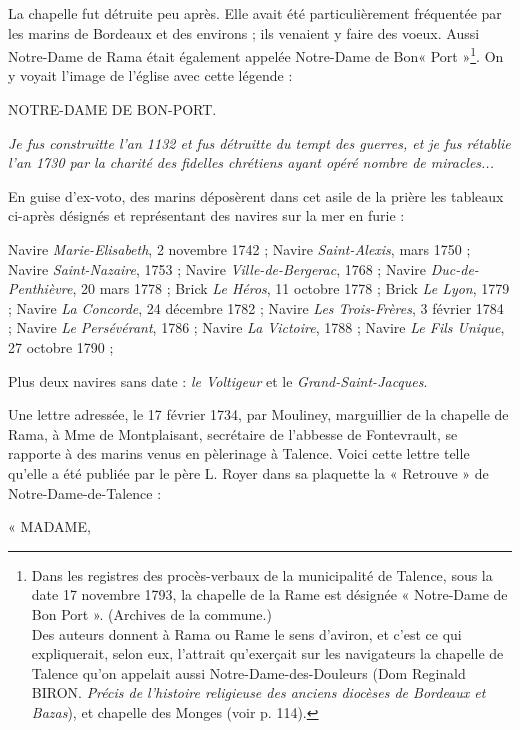 La chapelle fut détruite peu après. Elle avait été particulièrement fréquentée par les marins de Bordeaux et des environs ; ils venaient y faire des voeux. Aussi Notre-Dame de Rama était également appelée Notre-Dame de Bon« Port »\footnote{Dans les registres des procès-verbaux de la municipalité de Talence, sous la date 17 novembre 1793, la chapelle de la Rame est désignée « Notre-Dame de Bon Port ». (Archives de la commune.)\\Des auteurs donnent à Rama ou Rame le sens d'aviron, et c'est ce qui expliquerait, selon eux, l'attrait qu'exerçait sur les navigateurs la chapelle de Talence qu'on appelait aussi Notre-Dame-des-Douleurs (Dom Reginald BIRON. \textit{Précis de l'histoire religieuse des anciens diocèses de Bordeaux et Bazas}), et chapelle des Monges (voir p. 114).}. On y voyait l'image de l'église avec cette légende :

\begin{center}
NOTRE-DAME DE BON-PORT.
\end{center}

\textit{Je fus construitte l'an 1132 et fus détruitte du tempt des guerres, et je fus rétablie l'an 1730 par la charité des fidelles chrétiens ayant opéré nombre de miracles...}

En guise d'ex-voto, des marins déposèrent dans cet asile de la prière les tableaux ci-après désignés et représentant des navires sur la mer en furie : 

Navire \textit{Marie-Elisabeth}, 2 novembre 1742 ;
Navire \textit{Saint-Alexis}, mars 1750 ; 
Navire \textit{Saint-Nazaire}, 1753 ;
Navire \textit{Ville-de-Bergerac}, 1768 ;
Navire \textit{Duc-de-Penthièvre}, 20 mars 1778 ;
Brick \textit{Le Héros}, 11 octobre 1778 ;
Brick \textit{Le Lyon}, 1779 ;
Navire \textit{La Concorde}, 24 décembre 1782 ;
Navire \textit{Les Trois-Frères}, 3 février 1784 ; 
Navire \textit{Le Persévérant}, 1786 ; 
Navire \textit{La Victoire}, 1788 ;
Navire \textit{Le Fils Unique}, 27 octobre 1790 ;

Plus deux navires sans date : \textit{le Voltigeur} et le \textit{Grand-Saint-Jacques}.

Une lettre adressée, le 17 février 1734, par Mouliney, marguillier de la chapelle de Rama, à Mme de Montplaisant, secrétaire de l'abbesse de Fontevrault, se rapporte à des marins venus en pèlerinage à Talence. Voici cette lettre telle qu'elle a été publiée par le père L. Royer dans sa plaquette la « Retrouve » de Notre-Dame-de-Talence :

« MADAME, 

